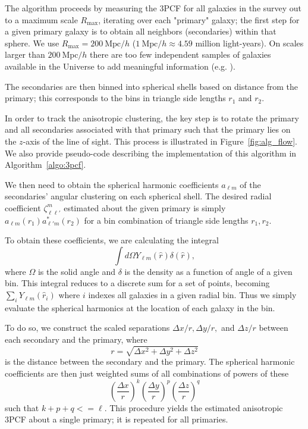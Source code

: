 The algorithm proceeds by measuring the 3PCF for all galaxies in the survey out to a maximum scale $R_{\text{max}}$, iterating over each "primary" galaxy; the first step for a given primary galaxy is to obtain all neighbors (secondaries) within that sphere. 
We use $R_{\text{max}} = 200~\text{Mpc}/h$ ($1~\text{Mpc}/h \approx 4.59$ million light-years). On scales larger than $200~\text{Mpc}/h$  there are too few independent samples of galaxies available in the Universe to add meaningful information (e.g. \cite{SERSDmodel}).

The secondaries are then binned into spherical shells based on distance from the primary; this corresponds to the bins in triangle side lengths $r_1$ and $r_2$. 

In order to track the anisotropic clustering, the key step is to rotate the primary and all secondaries associated with that primary such that the primary lies on the $z$-axis of the line of sight. 
This process is illustrated in Figure~\ref{fig:alg_flow}. 
We also provide pseudo-code describing the implementation of this algorithm in Algorithm~\ref{algo:3pcf}.

We then need to obtain the spherical harmonic coefficients $a_{\ell m}$ of the secondaries' angular clustering on each spherical shell.  The desired radial coefficient $\zeta_{\ell \ell'}^m$ estimated about the given primary is simply $a_{\ell m}(r_1)a_{\ell' m}^*(r_2)$ for a bin combination of triangle side lengths $r_1,r_2$. 

To obtain these coefficients, we are calculating the integral
\begin{equation*}
\int d\Omega Y_{\ell m}(\hat{r})\delta(\hat{r}),
\end{equation*}
where $\Omega$ is the solid angle and $\delta$ is the density as a function of angle of a given bin. This integral reduces to a discrete sum for a set of points, becoming $\sum_i Y_{\ell m}(\hat{r}_i)$ where $i$ indexes all galaxies in a given radial bin.  Thus we simply evaluate the spherical harmonics at the location of each galaxy in the bin.

To do so, we construct the scaled separations $\Delta x/r,\Delta y/r,$ and $\Delta z/r$ between each secondary and the primary, where
\begin{equation*}
r=\sqrt{\Delta x^2 +\Delta y^2 +\Delta z^2}
\end{equation*}
is the distance between the secondary and the primary. The spherical harmonic coefficients are then just weighted sums of all combinations of powers of these
\begin{equation}
\left( \frac{\Delta x}{r} \right)^k \left( \frac{\Delta y}{r} \right)^p \left(\frac{\Delta z}{r} \right)^q
\label{eqn:powers}
\end{equation}
such that $k+p+q<=\ell$.  
This procedure yields the estimated anisotropic 3PCF about a single primary; it is repeated for all primaries.  

